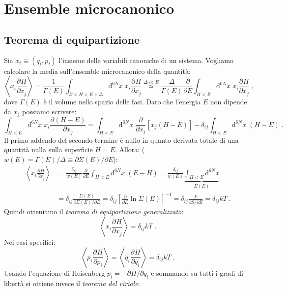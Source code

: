 \documentclass[10pt,a4paper]{report}
\theoremstyle{definition}
\newcommand{\pdev}[3][]{\frac{\partial^{#1} #2}{\partial #3^{#1}}}
\numberwithin{equation}{section}
\newcommand{\diff}[1][]{\mathrm{d}#1}
\begin{document}
\section{Ensemble microcanonico}
\subsection{Teorema di equipartizione}
Sia $x_i\equiv (q_i,p_i)$ l'insieme delle variabili canoniche di un sistema. Vogliamo calcolare la media sull'ensemble microcanonico della quantità:
\begin{equation}
\left\langle x_i\pdev{H}{x_j}\right\rangle =\frac{1}{\Gamma(E)}\int_{E<H<E+\Delta} \diff^{6N}{x}\;x_i\pdev{H}{x_j}\stackrel{\Delta\ll E}{\simeq} \frac{\Delta}{\Gamma(E)}\frac{\partial}{\partial E}\int_{H<E}\diff^{6N}x\; x_i\pdev{H}{x_j}\;,
\end{equation}
dove $\Gamma(E)$ è il volume nello spazio delle fasi. Dato che l'energia $E$ non dipende da $x_j$ possiamo scrivere:
\begin{equation*}
\int_{H<E}\diff^{6N}{x}\;x_i\pdev{(H-E)}{x_j}=\int_{H<E}\diff^{6N}{x}\;\frac{\partial}{\partial x_j}[x_j(H-E)]-\delta_{ij}\int_{H<E}\diff^{6N}{x}\;(H-E)\;.
\end{equation*}
Il primo addendo del secondo termine è nullo in quanto derivata totale di una quantità nulla sulla superficie $H=E$. Allora: ($w(E)=\Gamma(E)/\Delta\equiv\partial\Sigma(E)/\partial E$):
\begin{align*}
\left\langle x_i\pdev{H}{x_j}\right\rangle &= \frac{\delta_{ij}}{w(E)}\frac{\partial}{\partial E}\int_{H<E}\diff^{6N}{x}\;(E-H)=\frac{\delta_{ij}}{w(E)}\underbrace{\int_{H<E}\diff^{6N}{x}}_{\Sigma(E)}  \\
&= \delta_{ij}\frac{\Sigma(E)}{\partial\Sigma(E)/\partial E}=\delta_{ij}\left[\frac{\partial}{\partial E}\ln\Sigma(E)\right]^{-1}=\delta_{ij}\frac{k}{\partial S/\partial E}=\delta_{ij}kT\;.
\end{align*}
Quindi otteniamo il \emph{teorema di equipartizione generalizzato}:
\begin{equation}
\left\langle x_i\pdev{H}{x_j}\right\rangle = \delta_{ij}kT\;.
\end{equation}
Nei casi specifici:
\begin{equation}
\left\langle p_i\pdev{H}{p_i}\right\rangle=\left\langle q_i\pdev{H}{q_i}\right\rangle = \delta_{ij}kT\;.
\end{equation}
Usando l'equazione di Heisenberg $\dot{p}_i=-\partial H/\partial q_i$ e sommando su tutti i gradi di libertà si ottiene invece il \emph{teorema del viriale}:
\end{document}
